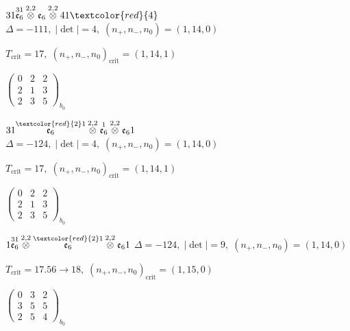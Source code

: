 \documentclass[10pt]{article}
\begin{document}
$31\overset{31}{\mathfrak{e}_6}\overset{2,2}{\otimes}\mathfrak{e}_6\overset{2,2}{\otimes}41\textcolor{red}{4}$ \quad $\Delta=-111,\; |\det|=4,\; (n_+,n_-,n_0)=(1,14,0)$

\hspace{1em}$T_{\text{crit}}=17,\; (n_+,n_-,n_0)_{\text{crit}}=(1,14,1)$

\hspace{2em}$\left(\begin{smallmatrix}0 & 2 & 2 \\ 2 & 1 & 3 \\ 2 & 3 & 5\end{smallmatrix}\right)_{\!b_0}$

\smallskip

$31\overset{\textcolor{red}{2}1}{\mathfrak{e}_6}\overset{2,2}{\otimes}\overset{1}{\mathfrak{e}_6}\overset{2,2}{\otimes}\mathfrak{e}_61$ \quad $\Delta=-124,\; |\det|=4,\; (n_+,n_-,n_0)=(1,14,0)$

\hspace{1em}$T_{\text{crit}}=17,\; (n_+,n_-,n_0)_{\text{crit}}=(1,14,1)$

\hspace{2em}$\left(\begin{smallmatrix}0 & 2 & 2 \\ 2 & 1 & 3 \\ 2 & 3 & 5\end{smallmatrix}\right)_{\!b_0}$

$1\overset{31}{\mathfrak{e}_6}\overset{2,2}{\otimes}\overset{\textcolor{red}{2}1}{\mathfrak{e}_6}\overset{2,2}{\otimes}\mathfrak{e}_61$ \quad $\Delta=-124,\; |\det|=9,\; (n_+,n_-,n_0)=(1,14,0)$

\hspace{1em}$T_{\text{crit}}=17.56 \to 18,\; (n_+,n_-,n_0)_{\text{crit}}=(1,15,0)$

\hspace{2em}$\left(\begin{smallmatrix}0 & 3 & 2 \\ 3 & 5 & 5 \\ 2 & 5 & 4\end{smallmatrix}\right)_{\!b_0}$

\smallskip
\end{document}
